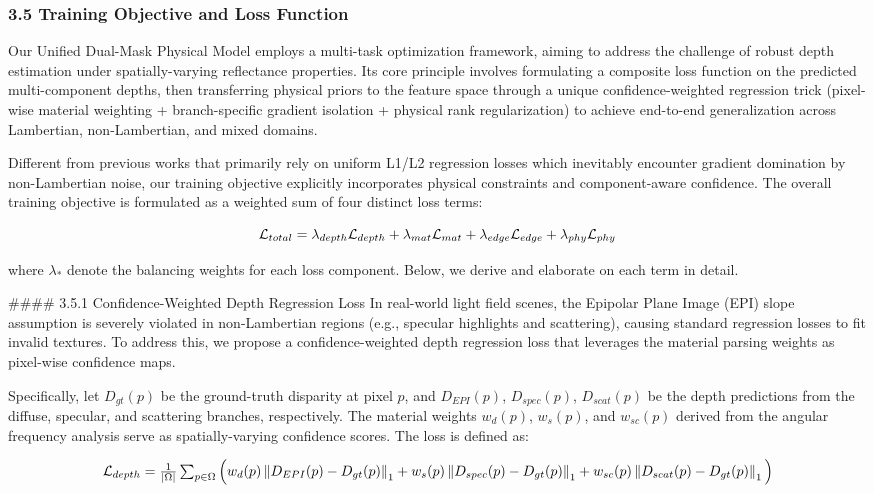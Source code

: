 \subsubsection{3.5 Training Objective and Loss Function}

Our Unified Dual-Mask Physical Model employs a multi-task optimization framework, aiming to address the challenge of robust depth estimation under spatially-varying reflectance properties. Its core principle involves formulating a composite loss function on the predicted multi-component depths, then transferring physical priors to the feature space through a unique confidence-weighted regression trick (pixel-wise material weighting + branch-specific gradient isolation + physical rank regularization) to achieve end-to-end generalization across Lambertian, non-Lambertian, and mixed domains. 

Different from previous works that primarily rely on uniform L1/L2 regression losses which inevitably encounter gradient domination by non-Lambertian noise, our training objective explicitly incorporates physical constraints and component-aware confidence. The overall training objective is formulated as a weighted sum of four distinct loss terms:

\[
$$ \mathcal{L}_{total} = \lambda_{depth} \mathcal{L}_{depth} + \lambda_{mat} \mathcal{L}_{mat} + \lambda_{edge} \mathcal{L}_{edge} + \lambda_{phy} \mathcal{L}_{phy} $$
\]

where $\lambda_{*}$ denote the balancing weights for each loss component. Below, we derive and elaborate on each term in detail.

\#\#\#\# 3.5.1 Confidence-Weighted Depth Regression Loss
In real-world light field scenes, the Epipolar Plane Image (EPI) slope assumption is severely violated in non-Lambertian regions (e.g., specular highlights and scattering), causing standard regression losses to fit invalid textures. To address this, we propose a confidence-weighted depth regression loss that leverages the material parsing weights as pixel-wise confidence maps. 

Specifically, let $D_{gt}(p)$ be the ground-truth disparity at pixel $p$, and $D_{EPI}(p)$, $D_{spec}(p)$, $D_{scat}(p)$ be the depth predictions from the diffuse, specular, and scattering branches, respectively. The material weights $w_d(p)$, $w_s(p)$, and $w_{sc}(p)$ derived from the angular frequency analysis serve as spatially-varying confidence scores. The loss is defined as:

\[
$$ \mathcal{L}_{depth} = \frac{1}{|\Omega|} \sum_{p \in \Omega} \Big( w_d(p) \left\| D_{EPI}(p) - D_{gt}(p) \right\|_1 + w_s(p) \left\| D_{spec}(p) - D_{gt}(p) \right\|_1 + w_{sc}(p) \left\| D_{scat}(p) - D_{gt}(p) \right\|_1 \Big) $$
\]

